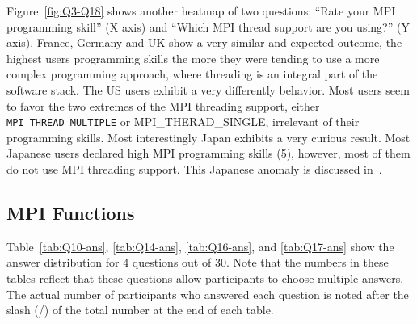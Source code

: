 \documentclass[sigconf,nonacm]{acmart}
\begin{document}
Figure~\ref{fig:Q3-Q18} shows another heatmap of two questions; ``Rate
your MPI programming skill'' (X axis) and ``Which MPI thread support
are you using?'' (Y axis).
%
France, Germany and UK show a very similar and expected outcome, the
highest users programming skills the more they were tending to use a
more complex programming approach, where threading is an integral part
of the software stack.
The US users exhibit a very differently behavior. Most users seem to
favor the two extremes of the MPI threading support, either {\tt
  MPI\_THREAD\_MULTIPLE} or {MPI\_THERAD\_SINGLE}, irrelevant of their
programming skills.
%
%
Most interestingly Japan exhibits a very
curious result. Most Japanese users declared high MPI programming skills (5),
however, most of them do not use MPI threading support. This Japanese
anomaly is discussed in~\cite{swopp2019}.

\subsection{MPI Functions}

Table~\ref{tab:Q10-ans}, \ref{tab:Q14-ans}, \ref{tab:Q16-ans}, and
\ref{tab:Q17-ans} show the answer distribution for 4 questions out of
30. Note that the numbers in these tables reflect that these questions
allow participants to choose multiple answers. 
The actual number of participants who answered
each question is noted after the slash (/) of the total number
at the end of each table.
\end{document}
